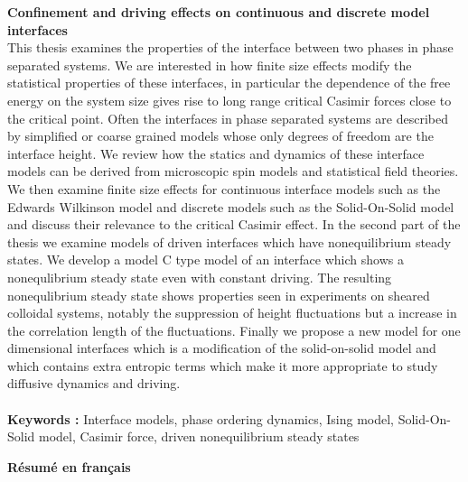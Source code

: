 {\bf Confinement and driving effects on continuous and discrete model interfaces}\\
This thesis examines the properties  of the interface between two phases in  phase separated systems. We are interested 
in how finite size effects modify the statistical properties of these interfaces, in particular  the dependence of the free energy on the system size 
gives rise to long range critical Casimir forces close to the critical point. Often the interfaces in phase separated systems are
described by simplified or coarse grained models whose only degrees of freedom are the interface height. We review how the statics and dynamics of
these  interface models can be derived from microscopic spin models and statistical field theories. We then examine finite size effects for 
continuous interface models such as the Edwards Wilkinson model and discrete models such as the Solid-On-Solid model  and discuss their 
relevance to the critical Casimir effect. In the second part of the thesis we examine models of driven interfaces which have nonequilibrium steady states. 
We develop a model C type model of an interface which shows a nonequlibrium steady
state even with constant driving. The resulting nonequlibrium steady state shows properties seen in experiments on sheared colloidal systems,
notably the suppression of height fluctuations but   a increase in the  correlation length of the fluctuations. Finally we propose a new model for
one dimensional interfaces which is a modification of  the solid-on-solid model and which contains extra entropic terms which make it more
appropriate to study diffusive dynamics and driving.
\\ \\
{\bf Keywords : }  Interface models, phase ordering dynamics, Ising model, Solid-On-Solid model, Casimir force, driven nonequilibrium steady states

\cleardoublepage
{\bf \huge Résumé en français} \\

